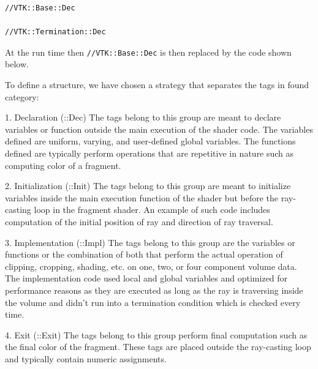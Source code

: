  \begin{lstlisting}
//VTK::Base::Dec

//VTK::Termination::Dec 
\end{lstlisting}

At the run time then \texttt{//VTK::Base::Dec} is then replaced by the code shown below. 

To define a structure, we have chosen a strategy that separates the tags in found category: 

1. Declaration (::Dec)
The tags belong to this group are meant to declare variables or function outside the main execution of the shader code. The variables defined are uniform, varying, and user-defined global variables. The functions defined are typically perform operations that are repetitive in nature such as computing color of a fragment. 

2. Initialization (::Init)
The tags belong to this group are meant to initialize variables inside the main execution function of the shader but before the ray-casting loop in the fragment shader. An example of such code includes computation of the initial position of ray and direction of ray traversal.

3. Implementation (::Impl)
The tags belong to this group are the variables or functions or the combination of both that perform the actual operation of clipping, cropping, shading, etc. on one, two, or four component volume data. The implementation code used local and global variables and optimized for performance reasons as they are executed as long as the ray is traversing inside the volume and didn't run into a termination condition which is checked every time.  

4. Exit (::Exit)
The tags belong to this group perform final computation such as the final color of the fragment. These tags are placed outside the ray-casting loop and typically contain numeric assignments.

